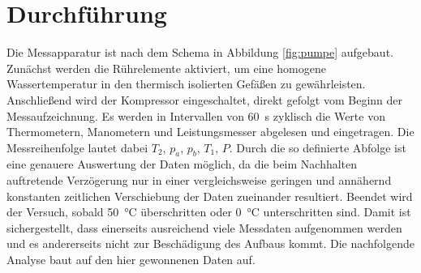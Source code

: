 
\vfill

\section{Durchführung}
\label{sec:durchführung}

Die Messapparatur ist nach dem Schema in Abbildung \ref{fig:pumpe} aufgebaut. Zunächst werden die
Rührelemente aktiviert, um eine homogene Wassertemperatur in den thermisch isolierten Gefäßen
zu gewährleisten. Anschließend wird der Kompressor eingeschaltet, direkt gefolgt vom Beginn der
Messaufzeichnung. Es werden in Intervallen von \qty{60}{\second} zyklisch die Werte von Thermometern,
Manometern und Leistungsmesser abgelesen und eingetragen. Die Messreihenfolge lautet dabei
$T_2$, $p_a$, $p_b$, $T_1$, $P$. Durch die so definierte Abfolge ist eine genauere Auswertung
der Daten möglich, da die beim Nachhalten auftretende Verzögerung nur in einer vergleichsweise
geringen und annähernd konstanten zeitlichen Verschiebung der Daten zueinander resultiert.
Beendet wird der Versuch, sobald \qty{50}{\celsius} überschritten oder \qty{0}{\celsius}
unterschritten sind. Damit ist sichergestellt, dass einerseits ausreichend viele Messdaten aufgenommen
werden und es andererseits nicht zur Beschädigung des Aufbaus kommt. Die nachfolgende Analyse baut auf
den hier gewonnenen Daten auf.

\vfill

